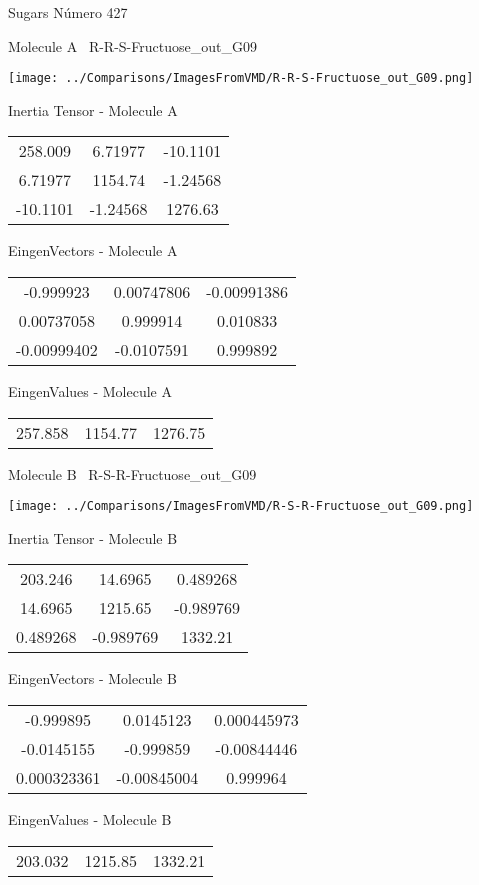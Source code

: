 \vtab[-3cm]
\begin{center}
{\large Sugars \tab Número 427}
\end{center}
\begin{multicols}{2}
\begin{center}

Molecule A \
R-R-S-Fructuose\_out\_G09

\texttt{[image: ../Comparisons/ImagesFromVMD/R-R-S-Fructuose\_out\_G09.png]}

Inertia Tensor - Molecule A \\
\begin{tabular}{|c c c|}
258.009	 & 	6.71977	 & 	-10.1101	 \\
6.71977	 & 	1154.74	 & 	-1.24568	 \\
-10.1101	 & 	-1.24568	 & 	1276.63
\end{tabular}

\vtab
 EingenVectors - Molecule A     \\
\begin{tabular}{|c c c|}
-0.999923	 & 	0.00747806	 & 	-0.00991386	 \\
0.00737058	 & 	0.999914	 & 	0.010833	 \\
-0.00999402	 & 	-0.0107591	 & 	0.999892
\end{tabular}

\vtab
 EingenValues - Molecule A     \\
\begin{tabular}{|c c c|}
257.858	 & 	1154.77	 & 	1276.75	 \\
\end{tabular}
\columnbreak

Molecule B \
R-S-R-Fructuose\_out\_G09

\texttt{[image: ../Comparisons/ImagesFromVMD/R-S-R-Fructuose\_out\_G09.png]}

Inertia Tensor - Molecule B \\
\begin{tabular}{|c c c|}
203.246	 & 	14.6965	 & 	0.489268	 \\
14.6965	 & 	1215.65	 & 	-0.989769	 \\
0.489268	 & 	-0.989769	 & 	1332.21
\end{tabular}

\vtab
 EingenVectors - Molecule B     \\
\begin{tabular}{|c c c|}
-0.999895	 & 	0.0145123	 & 	0.000445973	 \\
-0.0145155	 & 	-0.999859	 & 	-0.00844446	 \\
0.000323361	 & 	-0.00845004	 & 	0.999964
\end{tabular}

\vtab
 EingenValues - Molecule B     \\
\begin{tabular}{|c c c|}
203.032	 & 	1215.85	 & 	1332.21	 \\
\end{tabular}

\end{center}
\end{multicols}


